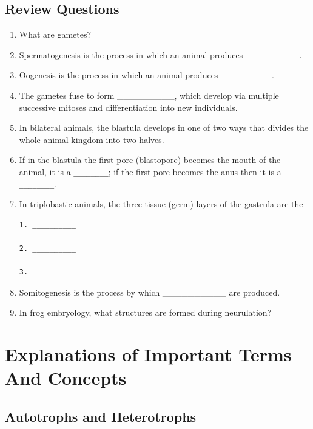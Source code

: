 \documentclass[]{book}
\begin{document}
\hypertarget{review-questions-10}{%
\section{Review Questions}\label{review-questions-10}}

\begin{enumerate}
\def\labelenumi{\arabic{enumi}.}
\item
  What are gametes?
\item
  Spermatogenesis is the process in which an animal produces \_\_\_\_\_\_\_\_ .
\item
  Oogenesis is the process in which an animal produces \_\_\_\_\_\_\_\_.
\item
  The gametes fuse to form \_\_\_\_\_\_\_\_\_, which develop via multiple successive mitoses and differentiation into new individuals.
\item
  In bilateral animals, the blastula develops in one of two ways that divides the whole animal kingdom into two halves.
\item
  If in the blastula the first pore (blastopore) becomes the mouth of the animal, it is a \texttt{\_\_\_\_\_\_\_\_}; if the first pore becomes the anus then it is a \texttt{\_\_\_\_\_\_\_\_}.
\item
  In triplobastic animals, the three tissue (germ) layers of the gastrula are the

\begin{verbatim}
1. __________

2. __________

3. __________
\end{verbatim}
\item
  Somitogenesis is the process by which \_\_\_\_\_\_\_\_\_\_ are produced.
\item
  In frog embryology, what structures are formed during neurulation?
\end{enumerate}

\hypertarget{appendix-appendix}{%
\appendix}


\hypertarget{explanations-of-important-terms-and-concepts}{%
\chapter{Explanations of Important Terms And Concepts}\label{explanations-of-important-terms-and-concepts}}

\hypertarget{autotrophs-and-heterotrophs}{%
\section{Autotrophs and Heterotrophs}\label{autotrophs-and-heterotrophs}}
\end{document}
